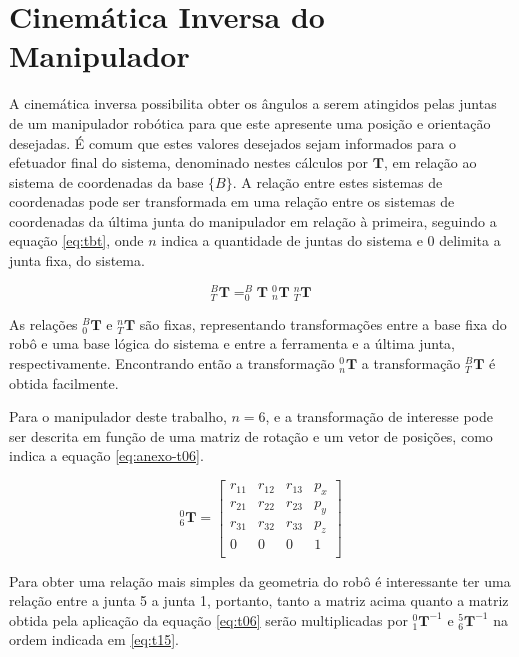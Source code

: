 \chapter{Cinemática Inversa do Manipulador}
\label{Anexo-CinInv}

A cinemática inversa possibilita obter os ângulos a serem atingidos pelas juntas de um
manipulador robótica para que este apresente uma posição e orientação desejadas. É comum
que estes valores desejados sejam informados para o efetuador final do sistema, denominado nestes 
cálculos por $\textbf{T}$, em relação ao sistema de coordenadas da base $\{B\}$.
A relação entre estes sistemas de coordenadas pode ser transformada em uma relação 
entre os sistemas de coordenadas da última junta do manipulador em relação à primeira, seguindo a equação 
\ref{eq:tbt}, onde $n$ indica a quantidade de juntas do sistema e $0$ delimita a junta fixa, do sistema.

\begin{equation}
    \label{eq:tbt}
    ^B_T\textbf{T} = ^B_0\!\textbf{T}\;^0_n\textbf{T}\;^n_T\textbf{T}
\end{equation}

As relações $^B_0\!\textbf{T}$ e $^n_T\textbf{T}$ são fixas, representando transformações entre a base fixa do 
robô e uma base lógica do sistema e entre a ferramenta e a última junta, respectivamente. 
Encontrando então a transformação $^0_n\textbf{T}$ a transformação $^B_T\textbf{T}$ é obtida facilmente. 

Para o manipulador deste trabalho, $n=6$, e a transformação de interesse pode ser descrita em 
função de uma matriz de rotação e um vetor de posições, como indica a equação \ref{eq:anexo-t06}.

\begin{equation}
    \label{eq:anexo-t06}
    ^0_6\textbf{T} = 
    \begin{bmatrix}
        r_{11} & r_{12} & r_{13} & p_x \\
        r_{21} & r_{22} & r_{23} & p_y \\
        r_{31} & r_{32} & r_{33} & p_z \\
           0   &    0   &    0   &  1  \\    
    \end{bmatrix}
\end{equation}

Para obter uma relação mais simples da geometria do robô é interessante ter uma relação 
entre a junta 5 a junta 1, portanto, tanto a matriz acima quanto a matriz obtida pela aplicação da
equação \ref{eq:t06} serão multiplicadas por $^0_1\textbf{T}^{-1}$ e $^5_6\textbf{T}^{-1}$ na ordem indicada em \ref{eq:t15}.

